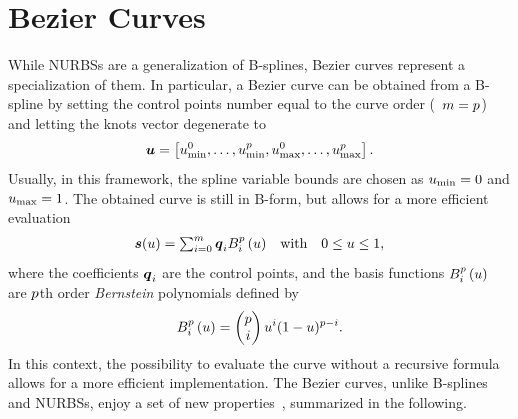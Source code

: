 \section{B\acuteacc ezier Curves}
While NURBSs are a generalization of B-splines, B\acuteacc ezier curves represent a specialization of them.
In particular, a B\acuteacc ezier curve can be obtained from a B-spline by setting the control points number
equal to the curve order (\ie~$m = p$) and letting the knots vector degenerate to
\begin{equation*}
    \boldsymbol{u} = \left[ u^0_{\text{min}}, \dots, u^{p}_{\text{min}},
    u^0_{\text{max}}, \dots, u^{p}_{\text{max}} \right].
\end{equation*}
Usually, in this framework, the spline variable bounds are chosen as $u_{\text{min}} = 0$ and $u_{\text{max}} = 1$.
The obtained curve is still in B-form, but allows for a more efficient evaluation
\begin{equation}%
    \label{EQ:BEZIER-FORM}
    \begin{matrix}
        \bs{\spline}(\splinevar) = \sum_{i=0}^{\cpnumber} \bs{\cpoint}_i \basis_i^{\order} \lp \splinevar \rp &
        \text{with} & 0 \le \splinevar \le 1,
    \end{matrix}
\end{equation}
where the coefficients $\boldsymbol{q}_i$ are the control points, and the basis functions $B_i^{p} \left( u \right)$
are $p$th order \emph{Bernstein} polynomials defined by
\begin{equation*}
    B_i^{p} \left( u \right) =
    \begin{pmatrix}
        p \\ i
    \end{pmatrix} u^i (1-u)^{p-i}.
\end{equation*}
In this context, the possibility to evaluate the curve without a recursive formula allows for a more efficient implementation.
The B\acuteacc ezier curves, unlike B-splines and NURBSs, enjoy a set of new properties~\cite*{farouki2012bernstein}, summarized in the following.
